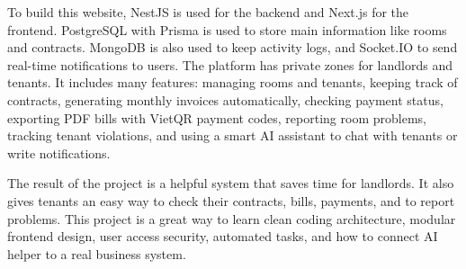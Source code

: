 \documentclass[12pt,a4paper]{report}
\begin{document}
To build this website, NestJS is used for the backend and Next.js for the frontend. PostgreSQL with Prisma is used to store main information like rooms and contracts. MongoDB is also used to keep activity logs, and Socket.IO to send real-time notifications to users. The platform has private zones for landlords and tenants. It includes many features: managing rooms and tenants, keeping track of contracts, generating monthly invoices automatically, checking payment status, exporting PDF bills with VietQR payment codes, reporting room problems, tracking tenant violations, and using a smart AI assistant to chat with tenants or write notifications.

The result of the project is a helpful system that saves time for landlords. It also gives tenants an easy way to check their contracts, bills, payments, and to report problems. This project is a great way to learn clean coding architecture, modular frontend design, user access security, automated tasks, and how to connect AI helper to a real business system.

\newpage
\tableofcontents
{}
\newpage
\listoffigures
{}
\newpage
\listoftables
{}
\newpage












\nocite{*}
\end{document}
